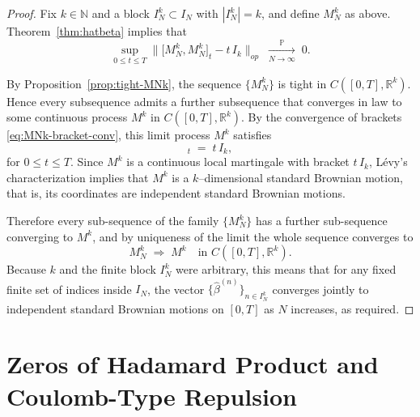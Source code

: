 \documentclass[12pt,reqno]{amsart}
\theoremstyle{plain}
\theoremstyle{definition}
\theoremstyle{remark}
\begin{document}
\begin{proof}
Fix $k\in\mathbb N$ and a block $I_N^k\subset I_N$ with $|I_N^k|=k$, and define
$M_N^k$ as above.  Theorem~\ref{thm:hatbeta} implies that 
\begin{equation}\label{eq:MNk-bracket-conv}
\sup_{0\le t\le T}\big\|\bigl[M_N^k,M_N^k\bigr]_t - t\,I_k\big\|_{op}
\;\xrightarrow[N\to\infty]{\ \mathbb P\ }\;0 .
\end{equation}

By Proposition~\ref{prop:tight-MNk}, the
sequence $\{M_N^k\}$ is tight in $C([0,T],\mathbb{R}^k)$. Hence every
subsequence admits a further subsequence that converges in law to some
continuous process $M^k$ in $C([0,T],\mathbb{R}^k)$. By the convergence of
brackets \eqref{eq:MNk-bracket-conv}, this limit process $M^k$ satisfies
\begin{equation}
[ M^k,M^k]_t \;=\; t\,I_k,
\end{equation}
for $0\le t\le T$. Since $M^k$ is a continuous local martingale with bracket $t\,I_k$, Lévy’s
characterization implies that $M^k$ is a $k$–dimensional standard Brownian motion, that is, its coordinates are independent standard Brownian motions.

Therefore every sub-sequence of the family $\{M_N^k\}$ has a further sub-sequence converging
to $M^k$, and by uniqueness of the limit the whole sequence converges to 
\begin{equation}
M_N^k \;\Rightarrow\; M^k \quad\text{in } C([0,T],\mathbb{R}^k).
\end{equation}
Because $k$ and the finite block $I_N^k$ were arbitrary, this means that for any
fixed finite set of indices inside $I_N$, the vector
$\{\hat\beta^{(n)}\}_{n\in I_N^k}$ converges jointly to independent standard
Brownian motions on $[0,T]$ as $N$ increases, as required.
\end{proof}


\section{Zeros of Hadamard Product and Coulomb-Type Repulsion}
\label{s:6}
\end{document}
